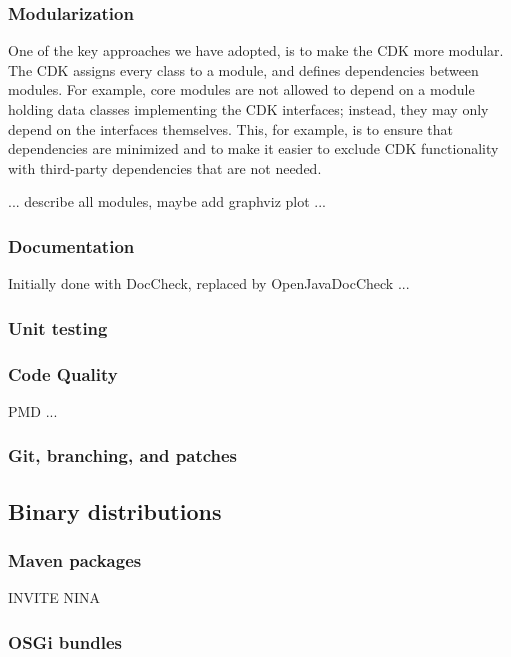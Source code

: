 \documentclass[10pt]{bmc_article}
\newenvironment{bmcformat}{\begin{raggedright}\baselineskip20pt\sloppy\setboolean{publ}{false}}{\end{raggedright}\baselineskip20pt\sloppy}
\begin{document}
\begin{bmcformat}
  \subsubsection*{Modularization}
  
One of the key approaches we have adopted, is to make the CDK more modular. The CDK assigns
every class to a module, and defines dependencies between modules. For example, core modules
are not allowed to depend on a module holding data classes implementing the CDK interfaces;
instead, they may only depend on the interfaces themselves. This, for example, is to ensure
that dependencies are minimized and to make it easier to exclude CDK functionality with
third-party dependencies that are not needed.

... describe all modules, maybe add graphviz plot ...




  \subsubsection*{Documentation}

  Initially done with DocCheck, replaced by OpenJavaDocCheck ...
  
  \subsubsection*{Unit testing}
  
  \subsubsection*{Code Quality}

  PMD ...

  \subsubsection*{Git, branching, and patches}
  
\subsection*{Binary distributions}

\subsubsection*{Maven packages}

INVITE NINA

\subsubsection*{OSGi bundles}


\end{bmcformat}
\end{document}
